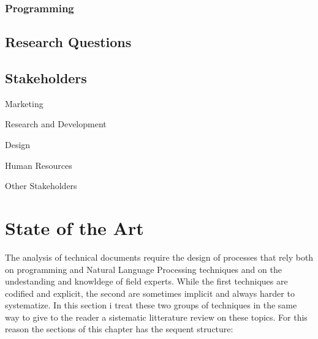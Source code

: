 \documentclass[]{book}
\theoremstyle{definition}
\theoremstyle{definition}
\theoremstyle{definition}
\theoremstyle{remark}
\begin{document}
\subsection{Programming}\label{programming}

\section{Research Questions}\label{research-questions}

\section{Stakeholders}\label{stakeholders}

Marketing

Research and Development

Design

Human Resources

Other Stakeholders

\chapter{State of the Art}\label{sota}

The analysis of technical documents require the design of processes that
rely both on programming and Natural Language Processing techniques and
on the undestanding and knowldege of field experts. While the first
techniques are codified and explicit, the second are sometimes implicit
and always harder to systematize. In this section i treat these two
groups of techniques in the same way to give to the reader a sistematic
litterature review on these topics. For this reason the sections of this
chapter has the sequent structure:
\end{document}
